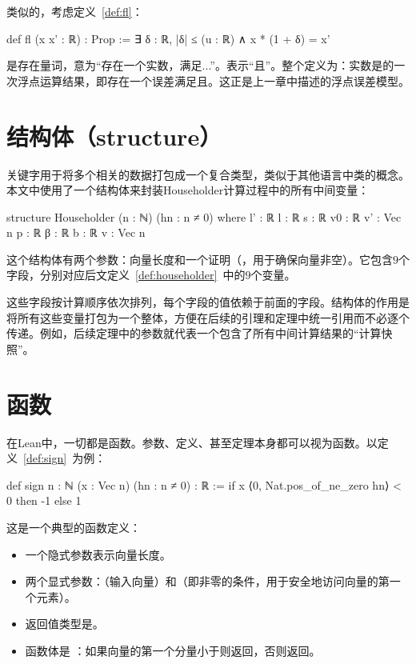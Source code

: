 ﻿\documentclass[UTF8,a4paper,openany]{ctexbook}
\theoremstyle{qrplain}
\begin{document}
类似的，考虑定义~\ref{def:fl}：

\begin{leancode}
  def fl (x x' : ℝ) : Prop :=
    ∃ δ : ℝ, |δ| ≤ (u : ℝ) ∧ x * (1 + δ) = x'
\end{leancode}

是存在量词，意为“存在一个实数，满足...”。表示“且”。整个定义为：实数是的一次浮点运算结果，即存在一个误差满足且。这正是上一章中描述的浮点误差模型。

\section{结构体（structure）}

关键字用于将多个相关的数据打包成一个复合类型，类似于其他语言中类的概念。本文中使用了一个结构体来封装Householder计算过程中的所有中间变量：

\begin{leancode}
  structure Householder (n : ℕ) (hn : n ≠ 0) where
    l' : ℝ
    l : ℝ
    s : ℝ
    v0 : ℝ
    v' : Vec n
    p : ℝ
    β : ℝ
    b : ℝ
    v : Vec n
\end{leancode}

这个结构体有两个参数：向量长度和一个证明（，用于确保向量非空）。它包含$9$个字段，分别对应后文定义~\ref{def:householder}~中的$9$个变量。

这些字段按计算顺序依次排列，每个字段的值依赖于前面的字段。结构体的作用是将所有这些变量打包为一个整体，方便在后续的引理和定理中统一引用而不必逐个传递。例如，后续定理中的参数就代表一个包含了所有中间计算结果的“计算快照”。

\section{函数}

在Lean中，一切都是函数。参数、定义、甚至定理本身都可以视为函数。以定义~\ref{def:sign}~为例：

\begin{leancode}
  def sign {n : ℕ} (x : Vec n) (hn : n ≠ 0) : ℝ :=
    if x ⟨0, Nat.pos_of_ne_zero hn⟩ < 0 then -1 else 1
\end{leancode}

这是一个典型的函数定义：
\begin{itemize}
  \item 一个隐式参数表示向量长度。
  \item 两个显式参数：（输入向量）和（即非零的条件，用于安全地访问向量的第一个元素）。
  \item 返回值类型是。
  \item 函数体是 ：如果向量的第一个分量小于则返回，否则返回。
\end{itemize}
\end{document}
